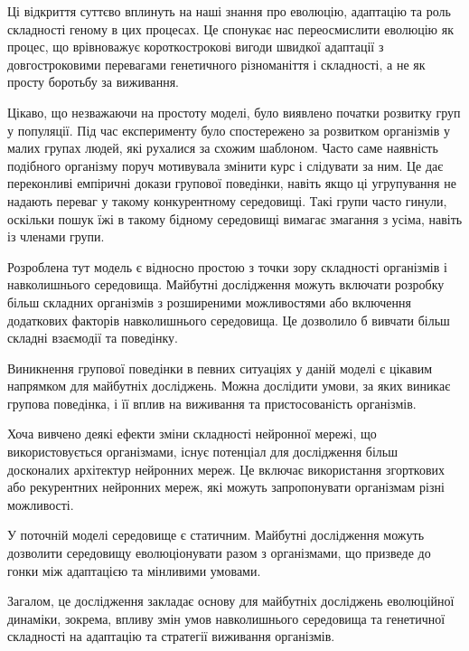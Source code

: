 Ці відкриття суттєво вплинуть на наші знання про еволюцію, 
адаптацію та роль складності геному в цих процесах. 
Це спонукає нас переосмислити еволюцію як процес, 
що врівноважує короткострокові вигоди швидкої адаптації 
з довгостроковими перевагами генетичного різноманіття 
і складності, а не як просту боротьбу за виживання.



Цікаво, що незважаючи на простоту моделі, 
було виявлено початки розвитку груп у популяції. 
Під час експерименту було спостережено за 
розвитком організмів у малих групах людей, 
які рухалися за схожим шаблоном.
Часто саме наявність подібного організму поруч 
мотивувала змінити курс і слідувати за ним.
Це дає переконливі емпіричні докази групової поведінки, 
навіть якщо ці угрупування не надають переваг у 
такому конкурентному середовищі.
Такі групи часто гинули, оскільки пошук їжі в 
такому бідному середовищі вимагає змагання з усіма, 
навіть із членами групи.


Розроблена тут модель є відносно простою з точки зору 
складності організмів і навколишнього середовища. 
Майбутні дослідження можуть включати розробку більш складних 
організмів з розширеними можливостями або включення 
додаткових факторів навколишнього середовища. 
Це дозволило б вивчати більш складні взаємодії та поведінку.

Виникнення групової поведінки в певних ситуаціях 
у даній моделі є цікавим напрямком для майбутніх досліджень. 
Можна дослідити умови, за яких виникає групова поведінка, 
і її вплив на виживання та пристосованість організмів.

Хоча вивчено деякі ефекти зміни складності нейронної мережі, 
що використовується організмами, існує потенціал для дослідження 
більш досконалих архітектур нейронних мереж. 
Це включає використання згорткових або рекурентних нейронних мереж, 
які можуть запропонувати організмам різні можливості.

У поточній моделі середовище є статичним. 
Майбутні дослідження можуть дозволити середовищу 
еволюціонувати разом з організмами, 
що призведе до гонки між адаптацією та мінливими умовами.

Загалом, це дослідження закладає основу для майбутніх 
досліджень еволюційної динаміки, зокрема, 
впливу змін умов навколишнього середовища та генетичної складності 
на адаптацію та стратегії виживання організмів.
